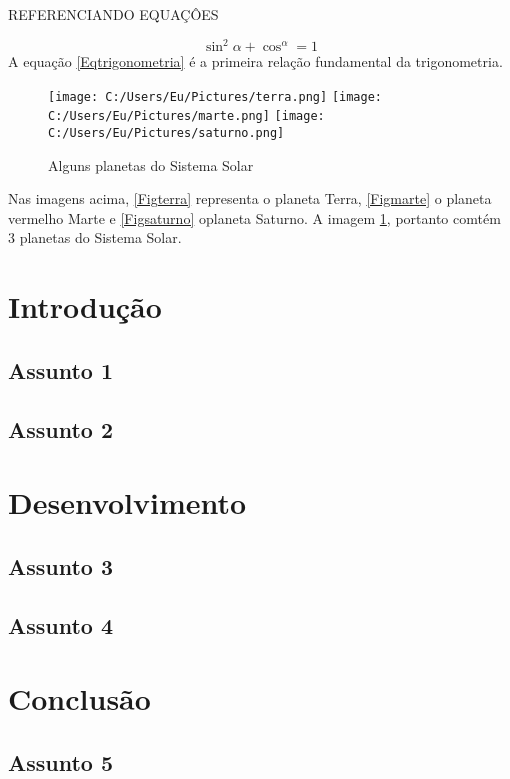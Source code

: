 \documentclass[12pt, a4paper, oneside]{book}
\begin{document}
REFERENCIANDO EQUAÇÔES
\vspace{1,5cm}

\begin{equation}\label{Eqtrigonometria}
\sin^{2}\alpha +\cos^\alpha = 1
\end{equation}
 A equação \ref{Eqtrigonometria} é a primeira relação fundamental da trigonometria.
 
 \newpage
 
\vspace{1,5cm}

\begin{figure}
\centering

\texttt{[image: C:/Users/Eu/Pictures/terra.png]}
\texttt{[image: C:/Users/Eu/Pictures/marte.png]}
\texttt{[image: C:/Users/Eu/Pictures/saturno.png]}
\caption{Alguns planetas do Sistema Solar}\label{figSistemaSolar}

\end{figure}

\vspace{0.2cm}

Nas imagens acima, \ref{Figterra} representa o planeta Terra, \ref{Figmarte} o planeta vermelho Marte e \ref{Figsaturno} oplaneta Saturno. A imagem \ref{figSistemaSolar}, portanto comtém 3 planetas do Sistema Solar.


\tableofcontents
\newpage

\chapter{Introdução}

\section{Assunto 1}

\section{Assunto 2}

\chapter{Desenvolvimento}

\section{Assunto 3}

\section{Assunto 4}

\chapter{Conclusão}

\section{Assunto 5}
\end{document}
